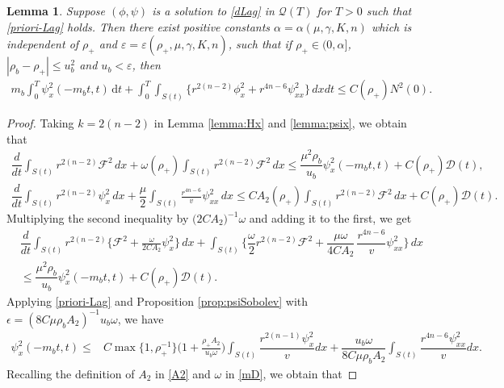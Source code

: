 \documentclass[a4paper,12pt,draft]{article}
\newtheorem{lemma}[theorem]{Lemma}
\theoremstyle{remark}
\def\dif{{\mathrm d}}
\def\ep{\varepsilon}
\def\mD{\mathcal{D}}
\def\mF{\mathcal{F}}
\def\mQ{\mathcal{Q}}
\begin{document}
\begin{lemma}\label{lemma:2n-4}
    Suppose $(\phi,\psi)$ is a solution to \eqref{dLag} in $\mQ(T)$ for $T>0$ such that \eqref{priori-Lag} holds. Then there exist positive constants $\alpha=\alpha(\mu,\gamma,K,n)$ which is independent of $\rho_+$ and $\ep=\ep(\rho_+,\mu,\gamma,K,n)$, such that if $\rho_+\in (0,\alpha]$, $|\rho_b-\rho_+|\le u_b^2$ and $u_b< \ep$, then
    \begin{align*}
         m_b\int_{0}^{T}\!\!\!\psi_x^2(-m_bt,t)\,\dif t + \int_{0}^{T}\!\!\int_{S(t)}\!\! \Big\{ r^{2(n-2)}\phi_x^2 +  r^{4n-6} \psi_{xx}^2 \Big\} \, d x d t \le  C(\rho_{+}) N^2(0).
    \end{align*}
\end{lemma}
\begin{proof}
Taking $k=2(n-2)$ in Lemma \ref{lemma:Hx} and \ref{lemma:psix}, we obtain that
\begin{gather*}
    \dfrac{d }{d t} \int_{S(t)}\!\! r^{2(n-2)} \mF^2\, d x + \omega(\rho_{+})\int_{S(t)}\!\! r^{2(n-2)}\mF^2 \, d x \le  \dfrac{\mu^2 \rho_b}{u_b} \psi_x^2(-m_b t,t)  + C(\rho_{+}) \mD(t), \\
    \dfrac{d }{d t}\int_{S(t)}\!\!\! r^{2(n-2)}\psi_x^2\,d x  + \dfrac{\mu}{2} \int_{S(t)}\!\!\!\! \frac{r^{4n-6}}{v}\psi_{xx}^2\, d x \le   C A_2(\rho_{+}) \int_{S(t)} \!\!\! r^{2(n-2)} \mF^2\,d x + C(\rho_+)\mD(t) . 
\end{gather*}
Multiplying the second inequality by $\big(2CA_2\big)^{-1} \omega$ and adding it to the first, we get
\begin{align}
    &\dfrac{d }{d t} \int_{S(t)}\!\! r^{2(n-2)} \Big\{ \mF^2 + \frac{\omega}{2C A_2} \psi_x^2 \Big\}\, d x  + \int_{S(t)}\!\! \Big\{ \dfrac{\omega}{2}r^{2(n-2)}\mF^2 + \dfrac{\mu\omega}{4C A_2} \dfrac{}{} \dfrac{r^{4n-6}}{v} \psi_{xx}^2 \Big\} \, d x \nonumber\\
    & \le \dfrac{\mu^2 \rho_b}{u_b} \psi_x^2(-m_b t,t)  + C(\rho_{+}) \mD(t). \label{temp:Fpsix}
\end{align}
Applying \eqref{priori-Lag} and Proposition \ref{prop:psiSobolev} with $\epsilon=(8C \mu \rho_b A_2)^{-1}u_b\omega$, we have
\begin{align*}
    \psi_x^2(-m_b t,t) \le& C \max\{1,\rho_{+}^{-1}\} \Big( 1 + \frac{\rho_{+} A_2}{u_b \omega} \Big) \int_{S(t)}\!\!\!\! \dfrac{r^{2(n-1)}\psi_x^2}{v}  dx +  \dfrac{u_b \omega}{8C \mu \rho_b A_2}\int_{S(t)}\!\!\!\! \dfrac{r^{4n-6}\psi_{xx}^2}{v} dx.
\end{align*}
Recalling the definition of $A_2$ in \eqref{A2} and $\omega$ in \eqref{mD}, we obtain that

\end{proof}
\end{document}

